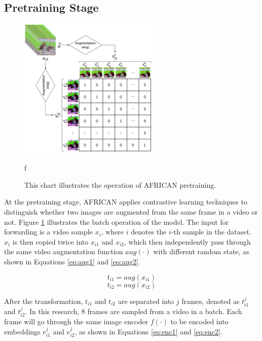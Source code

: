 \subsection{Pretraining Stage}

\begin{figure}[ht]
    \centering
    \includegraphics[width=0.6\textwidth]{assets/imgs/3_3_ConstrastiveSimilarityMatrix}
    \caption[Operation of AFRICAN pretraining]{This chart illustrates the operation of AFRICAN pretraining.}
f\label{fig:modelstructafsim}
\end{figure}

At the pretraining stage, AFRICAN applies contrastive learning techniques to distinguish whether two images are augmented from the same frame in a video or not. Figure \ref{fig:modelstructafsim} illustrates the batch operation of the model. The input for forwarding is a video sample $x_i$, where $i$ denotes the $i$-th sample in the dataset. $x_i$ is then copied twice into $x_{i1}$ and $x_{i2}$, which then independently pass through the same video augmentation function $aug(\cdot)$ with different random state, as shown in Equations \ref{eq:aug1} and \ref{eq:aug2}. 

\begin{equation}
    \label{eq:aug1}
    t_{i1} = aug(x_{i1})
\end{equation}
\begin{equation}
    \label{eq:aug2}
    t_{i2} = aug(x_{i2})
\end{equation}

After the transformation, $t_{i1}$ and $t_{i2}$ are separated into $j$ frames, denoted as $t_{i1}^j$ and $t_{i2}^j$. In this research, 8 frames are sampled from a video in a batch. Each frame will go through the same image encoder $f(\cdot)$ to be encoded into embeddings $e_{i1}^j$ and $e_{i2}^j$, as shown in Equations \ref{eq:enc1} and \ref{eq:enc2}.

